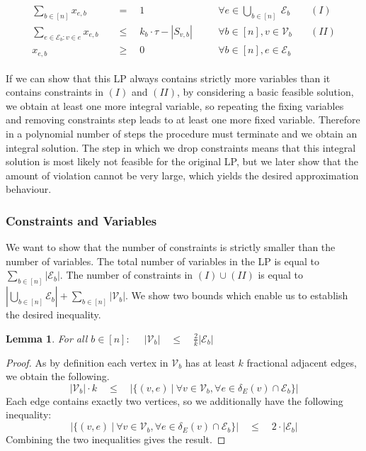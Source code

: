 \documentclass[11pt]{article}
\newtheorem{lemma}[theorem]{Lemma}
\begin{document}
\begin{gather*}
\begin{aligned}
\sum_{b \in [n]}x_{e,b} \quad &= \quad 1 &&\forall e \in \bigcup_{b \in [n]}\  \mathcal{E}_b& \quad(I)\\
\sum_{e \in \mathcal{E}_b: v \in e} x_{e,b} \quad&\le \quad k_b \cdot \tau - |S_{v,b}|\quad &&\forall b \in [n], v \in \mathcal{V}_b &\quad(II)\\
x_{e,b}\quad&\ge\quad 0 && \forall b \in [n], e \in \mathcal{E}_b
\end{aligned}
\end{gather*}

If we can show that this LP always contains strictly more variables than it contains constraints in $(I)$ and $(II)$, by considering a basic feasible solution, we obtain at least one more integral variable, so repeating the fixing variables and removing constraints step leads to at least one more fixed variable. Therefore in a polynomial number of steps the procedure must terminate and we obtain an integral solution. The step in which we drop constraints means that this integral solution is most likely not feasible for the original LP, but we later show that the amount of violation cannot be very large, which yields the desired approximation behaviour.

\subsubsection*{Constraints and Variables}
We want to show that the number of constraints is strictly smaller than the number of variables. The total number of variables in the LP is equal to $\sum_{b \in [n]}|\mathcal{E}_b|$. The number of constraints in $(I) \cup (II)$ is equal to $|\bigcup_{b \in [n]} \mathcal{E}_b| + \sum_{b \in [n]}|\mathcal{V}_b|$.
We show two bounds which enable us to establish the desired inequality.
\begin{lemma}
    For all $b \in [n]:$ $\quad|\mathcal{V}_b| \quad \le \quad \frac{2}{k}|\mathcal{E}_b|$
\end{lemma}
\begin{proof}
As by definition each vertex in $\mathcal{V}_b$ has at least $k$ fractional adjacent edges, we obtain the following. 
\begin{equation*}
|\mathcal{V}_b| \cdot k \quad \le \quad |\{(v,e) \ |\ \forall v \in \mathcal{V}_b, \forall e \in \delta_E(v) \cap \mathcal{E}_b\}|
\end{equation*}
Each edge contains exactly two vertices, so we additionally have the following inequality:
\begin{equation*}
|\{(v,e)\ |\ \forall v \in \mathcal{V}_b, \forall e \in \delta_E(v) \cap \mathcal{E}_b\}|\quad\le\quad 2 \cdot |\mathcal{E}_b|
\end{equation*}
Combining the two inequalities gives the result.
\end{proof}
\end{document}
